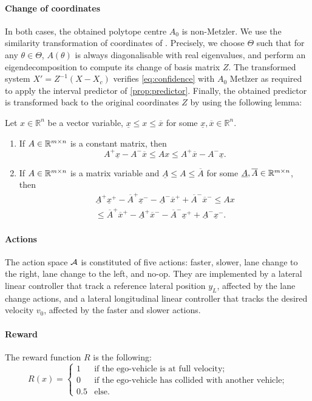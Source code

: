 \documentclass{article}
\begin{document}
\paragraph{Change of coordinates}
In both cases, the obtained polytope centre $A_0$ is non-Metzler.
We use the similarity transformation of coordinates of \citet{Efimov2013}. Precisely, we choose $\Theta$ such that for any $\theta\in\Theta$, $A(\theta)$ is always diagonalisable with real eigenvalues, and perform an eigendecomposition to compute its change of basis matrix $Z$. The transformed system $X'=Z^{-1}(X-X_c)$ verifies \eqref{eq:confidence} with $A_0$ Metlzer as required to apply the interval predictor of \autoref{prop:predictor}. Finally, the obtained predictor is transformed back to the original coordinates $Z$ by using the following lemma:
\begin{lemma}
	 \label{lem:interval} Let $x\in\mathbb{R}^{n}$ be a vector variable, $\underline{x}\le x\le\overline{x}$ for some $\underline{x},\overline{x}\in\mathbb{R}^{n}$. 
	
	\begin{enumerate}
		\item If $A\in\mathbb{R}^{m\times n}$ is a constant matrix, then
		\begin{equation}
		A^{+}\underline{x}-A^{-}\overline{x}\le Ax\le A^{+}\overline{x}-A^{-}\underline{x}.\label{eq:Interval1}
		\end{equation}
		\item If $A\in\mathbb{R}^{m\times n}$ is a matrix variable and \textup{$\underline{A}\le A\le\overline{A}$} for some $\underline{A},\overline{A}\in\mathbb{R}^{m\times n}$, then
		\begin{gather}
		\underline{A}^{+}\underline{x}^{+}-\overline{A}^{+}\underline{x}^{-}-\underline{A}^{-}\overline{x}^{+}+\overline{A}^{-}\overline{x}^{-}\leq Ax\label{eq:Interval2}\\
		\leq\overline{A}^{+}\overline{x}^{+}-\underline{A}^{+}\overline{x}^{-}-\overline{A}^{-}\underline{x}^{+}+\underline{A}^{-}\underline{x}^{-}.\nonumber 
		\end{gather}
	\end{enumerate}
\end{lemma}

\paragraph{Actions}

The action space $\mathcal{A}$ is constituted of five actions: faster, slower, lane change to the right, lane change to the left, and no-op. They are implemented by a lateral linear controller that track a reference lateral position $y_L$, affected by the lane change actions, and a lateral longitudinal linear controller that tracks the desired velocity $v_0$, affected by the faster and slower actions.

\paragraph{Reward}

The reward function $R$ is the following:
\[
R(x) = 
\begin{cases}
1 & \text{if the ego-vehicle is at full velocity;}\\
0 & \text{if the ego-vehicle has collided with another vehicle;}\\
0.5 & \text{else.}
\end{cases}\]
\end{document}
